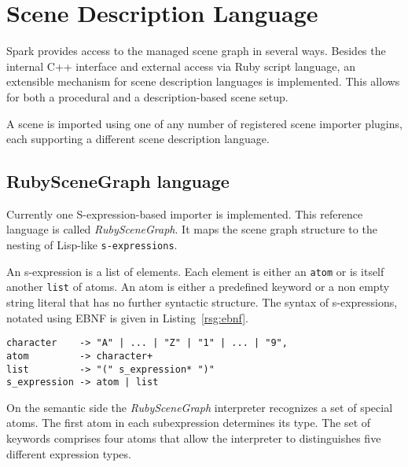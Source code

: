 \section{Scene Description Language}
\label{sec:scene}
Spark provides access to the managed scene graph in several ways.
Besides the internal C++ interface and external access via Ruby script
language, an extensible mechanism for scene description languages is
implemented. This allows for both a procedural and a description-based
scene setup.

A scene is imported using one of any number of registered scene
importer plugins, each supporting a different scene description
language. 

\subsection{RubySceneGraph language}

Currently one S-expression-based importer is implemented. This
reference language is called \emph{RubySceneGraph}. It maps the scene
graph structure to the nesting of Lisp-like \texttt{s-expressions}.

An s-expression is a list of elements. Each element is either an
\texttt{atom} or is itself another \texttt{list} of atoms. An atom is
either a predefined keyword or a non empty string literal that has no
further syntactic structure. The syntax of s-expressions, notated
using EBNF is given in Listing~\ref{rsg:ebnf}.

\lstset{captionpos=b,frame=none,%
  basicstyle=\small,breaklines=true}

\begin{lstlisting}[caption={EBNF notation of s-expressions}, label=rsg:ebnf]
character    -> "A" | ... | "Z" | "1" | ... | "9",
atom         -> character+
list         -> "(" s_expression* ")"
s_expression -> atom | list
\end{lstlisting}

\lstset{language=lisp,language=lisp,captionpos=b,frame=none,%
  basicstyle=\small,commentstyle=\bf,breaklines=true}

On the semantic side the \emph{RubySceneGraph} interpreter recognizes
a set of special atoms. The first atom in each subexpression
determines its type. The set of keywords comprises four atoms that
allow the interpreter to distinguishes five different expression
types. 

